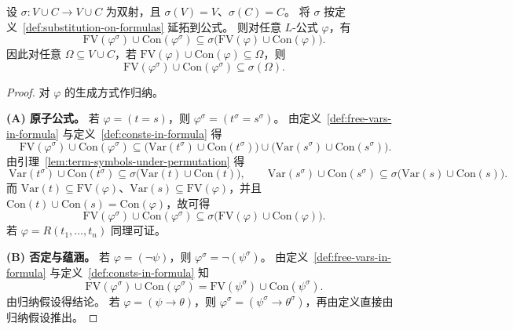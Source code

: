 \documentclass[lang=cn,a4paper,newtx,section]{elegantbook}
\begin{document}
\begin{lemma}[置换下公式的出现符号]
\label{formula-symbols-under-permutation}
设 $\sigma:V\cup C\to V\cup C$ 为双射，且 $\sigma(V)=V$、$\sigma(C)=C$。
将 $\sigma$ 按定义~\ref{def:substitution-on-formulas} 延拓到公式。
则对任意 $L$-公式 $\varphi$，有
\[
  \mathrm{FV}(\varphi^{\sigma})\cup\mathrm{Con}(\varphi^{\sigma})\subseteq \sigma\bigl(\mathrm{FV}(\varphi)\cup\mathrm{Con}(\varphi)\bigr).
\]
因此对任意 $\Omega\subseteq V\cup C$，若 $\mathrm{FV}(\varphi)\cup\mathrm{Con}(\varphi)\subseteq\Omega$，则
\[
  \mathrm{FV}(\varphi^{\sigma})\cup\mathrm{Con}(\varphi^{\sigma})\subseteq\sigma(\Omega).
\]
\end{lemma}

\begin{proof}
对 $\varphi$ 的生成方式作归纳。

\textbf{(A) 原子公式。}
若 $\varphi=(t=s)$，则 $\varphi^{\sigma}=(t^{\sigma}=s^{\sigma})$。
由定义~\ref{def:free-vars-in-formula} 与定义~\ref{def:consts-in-formula} 得
 \[\
   \mathrm{FV}(\varphi^{\sigma})\cup\mathrm{Con}(\varphi^{\sigma})\subseteq\bigl(\mathrm{Var}(t^{\sigma})\cup\mathrm{Con}(t^{\sigma})\bigr)\cup\bigl(\mathrm{Var}(s^{\sigma})\cup\mathrm{Con}(s^{\sigma})\bigr).
 \]
 由引理~\ref{lem:term-symbols-under-permutation} 得
 \[\
   \mathrm{Var}(t^{\sigma})\cup\mathrm{Con}(t^{\sigma})\subseteq\sigma\bigl(\mathrm{Var}(t)\cup\mathrm{Con}(t)\bigr),\qquad \mathrm{Var}(s^{\sigma})\cup\mathrm{Con}(s^{\sigma})\subseteq\sigma\bigl(\mathrm{Var}(s)\cup\mathrm{Con}(s)\bigr).
 \]
 而 $\mathrm{Var}(t)\subseteq\mathrm{FV}(\varphi)$、$\mathrm{Var}(s)\subseteq\mathrm{FV}(\varphi)$，并且 $\mathrm{Con}(t)\cup\mathrm{Con}(s)=\mathrm{Con}(\varphi)$，故可得
\[
  \mathrm{FV}(\varphi^{\sigma})\cup\mathrm{Con}(\varphi^{\sigma})\subseteq\sigma\bigl(\mathrm{FV}(\varphi)\cup\mathrm{Con}(\varphi)\bigr).
\]
若 $\varphi=R(t_1,\dots,t_n)$ 同理可证。

\textbf{(B) 否定与蕴涵。}
若 $\varphi=(\neg\psi)$，则 $\varphi^{\sigma}=\neg(\psi^{\sigma})$。
由定义~\ref{def:free-vars-in-formula} 与定义~\ref{def:consts-in-formula} 知
\[
  \mathrm{FV}(\varphi^{\sigma})\cup\mathrm{Con}(\varphi^{\sigma})=\mathrm{FV}(\psi^{\sigma})\cup\mathrm{Con}(\psi^{\sigma}).
\]
由归纳假设得结论。
若 $\varphi=(\psi\to\theta)$，则 $\varphi^{\sigma}=(\psi^{\sigma}\to\theta^{\sigma})$，再由定义直接由归纳假设推出。


\end{proof}
\end{document}
